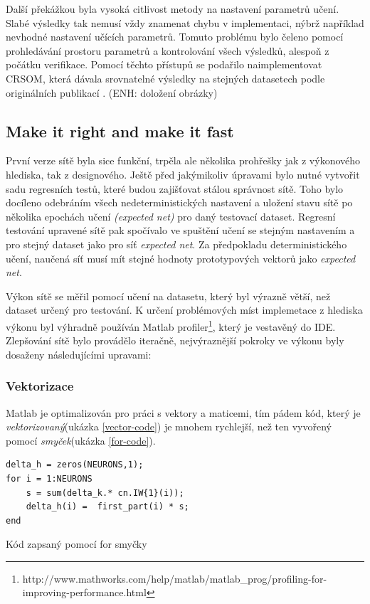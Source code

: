 \documentclass[thesis=M,czech]{FITthesis}[2012/06/26]
\begin{document}
Další překážkou byla vysoká citlivost metody na nastavení parametrů učení\cite{hartono14}. Slabé výsledky tak nemusí vždy znamenat chybu v implementaci, nýbrž například nevhodné nastavení učících parametrů. Tomuto problému bylo čeleno pomocí prohledávání prostoru parametrů a kontrolování všech výsledků, alespoň z počátku verifikace.
Pomocí těchto přístupů se podařilo naimplementovat CRSOM, která dávala srovnatelné výsledky na stejných datasetech podle originálních publikací \cite{hartono14}. (ENH: doložení obrázky)

\subsection{Make it right and make it fast}

První verze sítě byla sice funkční, trpěla ale několika prohřešky jak z výkonového hlediska, tak z designového. Ještě před jakýmikoliv úpravami bylo nutné vytvořit sadu regresních testů, které budou zajišťovat stálou správnost sítě. Toho bylo docíleno odebráním všech nedeterministických nastavení a uložení stavu sítě po několika epochách učení \textit{(expected net)} pro daný testovací dataset.  Regresní testování upravené sítě pak spočívalo ve spuštění učení se stejným nastavením a pro stejný dataset jako pro síť \textit{expected net}. Za předpokladu deterministického učení, naučená síť musí mít stejné hodnoty prototypových vektorů jako \textit{expected net}.

Výkon sítě se měřil pomocí učení na datasetu, který byl výrazně větší, než dataset určený pro testování. K určení problémových míst implemetace z hlediska výkonu byl výhradně používán Matlab profiler\footnote{http://www.mathworks.com/help/matlab/matlab\_prog/profiling-for-improving-performance.html}, který je vestavěný do IDE. Zlepšování sítě bylo provádělo iteračně, nejvýraznější pokroky ve výkonu byly dosaženy následujícími upravami:





\subsubsection*{Vektorizace}
Matlab je optimalizován pro práci s vektory a maticemi, tím pádem kód, který je \textit{vektorizovaný}(ukázka \ref{vector-code}) je mnohem rychlejší\cite{vector}, než ten vyvořený pomocí \textit{smyček}(ukázka \ref{for-code}).


\begin{listing}
\begin{verbatim}
delta_h = zeros(NEURONS,1);
for i = 1:NEURONS
    s = sum(delta_k.* cn.IW{1}(i));
    delta_h(i) =  first_part(i) * s;
end
\end{verbatim} 
\caption{Kód zapsaný pomocí for smyčky} 
\label{for-code}
\end{listing}
\end{document}
